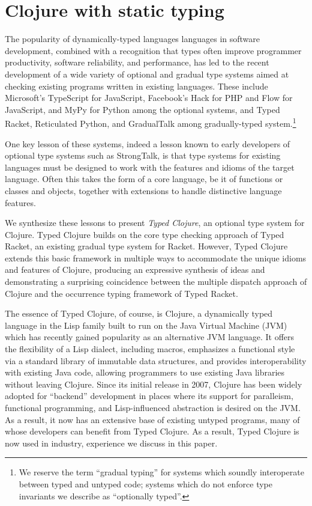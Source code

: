 \section{Clojure with static typing}


The popularity of dynamically-typed languages languages in software
development, combined with a recognition that types often improve
programmer productivity, software reliability, and performance, has
led to the recent development of a wide variety of optional and
gradual type systems aimed at checking existing programs written in
existing languages.  These include Microsoft's TypeScript for
JavaScript, Facebook's Hack for PHP and Flow for JavaScript, and MyPy
for Python among the optional systems, and Typed Racket, Reticulated
Python, and GradualTalk among gradually-typed system.\footnote{We
  reserve the term ``gradual typing'' for systems which soundly
  interoperate between typed and untyped code; systems which do not
  enforce type invariants we describe as ``optionally typed''.}

One key lesson of these systems, indeed a lesson known to early
developers of optional type systems such as StrongTalk, is that type
systems for existing languages must be designed to work with the
features and idioms of the target language. Often this takes the form
of a core language, be it of functions or classes and objects,
together with extensions to handle distinctive language features.


We synthesize these lessons to present \emph{Typed Clojure}, an
optional type system for Clojure. Typed Clojure builds on the core
type checking approach of Typed Racket, an existing gradual type
system for Racket. However, Typed Clojure extends this basic framework
in multiple ways to accommodate the unique idioms and features of
Clojure, producing an expressive synthesis of ideas and demonstrating
a surprising coincidence between the multiple dispatch approach of
Clojure and the occurrence typing framework of Typed Racket. 

The essence of Typed Clojure, of course, is Clojure, a dynamically
typed language in the Lisp family built to run on the Java Virtual
Machine (JVM) which has recently gained popularity as an alternative
JVM language.  It offers the flexibility of a Lisp dialect, including
macros, emphasizes a functional style via a
standard library of immutable data structures, and provides
interoperability with existing Java code, allowing programmers to use
existing Java libraries without leaving Clojure.
%
Since its initial release in 2007, Clojure has been widely adopted for
``backend'' development in places where its support for paralleism,
functional programming, and Lisp-influenced abstraction is desired on
the JVM. As a result, it now has an extensive base of existing untyped
programs, many of whose developers can benefit from Typed Clojure. As
a result, Typed Clojure is now used in industry, experience we discuss
in this paper.

